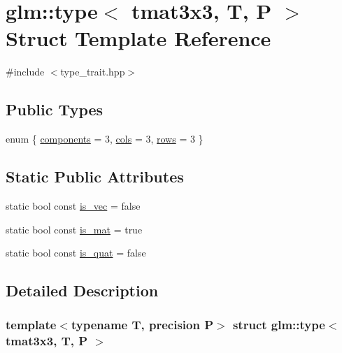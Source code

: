 \hypertarget{structglm_1_1type_3_01tmat3x3_00_01_t_00_01_p_01_4}{}\section{glm\+::type$<$ tmat3x3, T, P $>$ Struct Template Reference}
\label{structglm_1_1type_3_01tmat3x3_00_01_t_00_01_p_01_4}


{\ttfamily \#include $<$type\+\_\+trait.\+hpp$>$}

\subsection*{Public Types}
\begin{DoxyCompactItemize}
\item 
enum \{ \mbox{\hyperlink{structglm_1_1type_3_01tmat3x3_00_01_t_00_01_p_01_4_a71571b8dae1727e5f0338639fff0dfeea651fa413d39b086692490084bccd5f44}{components}} = 3, 
\mbox{\hyperlink{structglm_1_1type_3_01tmat3x3_00_01_t_00_01_p_01_4_a71571b8dae1727e5f0338639fff0dfeeaacb959ac4d8b654d99df57c2aab3a9b2}{cols}} = 3, 
\mbox{\hyperlink{structglm_1_1type_3_01tmat3x3_00_01_t_00_01_p_01_4_a71571b8dae1727e5f0338639fff0dfeead634c47020f033a7716fd5ccb2302251}{rows}} = 3
 \}
\end{DoxyCompactItemize}
\subsection*{Static Public Attributes}
\begin{DoxyCompactItemize}
\item 
static bool const \mbox{\hyperlink{structglm_1_1type_3_01tmat3x3_00_01_t_00_01_p_01_4_ad3a93969cb5d00ea024e5defb5379f37}{is\+\_\+vec}} = false
\item 
static bool const \mbox{\hyperlink{structglm_1_1type_3_01tmat3x3_00_01_t_00_01_p_01_4_abade54049ccd6c552a1cfe659f0b9eca}{is\+\_\+mat}} = true
\item 
static bool const \mbox{\hyperlink{structglm_1_1type_3_01tmat3x3_00_01_t_00_01_p_01_4_aadc0f3be5741fd1f33813e2390400b3a}{is\+\_\+quat}} = false
\end{DoxyCompactItemize}


\subsection{Detailed Description}
\subsubsection*{template$<$typename T, precision P$>$\newline
struct glm\+::type$<$ tmat3x3, T, P $>$}



